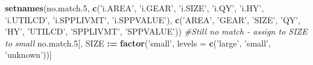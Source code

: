 \documentclass[]{article}
\newenvironment{Shaded}{\begin{snugshade}}{\end{snugshade}}
\newcommand{\KeywordTok}[1]{\textcolor[rgb]{0.13,0.29,0.53}{\textbf{#1}}}
\newcommand{\DataTypeTok}[1]{\textcolor[rgb]{0.13,0.29,0.53}{#1}}
\newcommand{\DecValTok}[1]{\textcolor[rgb]{0.00,0.00,0.81}{#1}}
\newcommand{\StringTok}[1]{\textcolor[rgb]{0.31,0.60,0.02}{#1}}
\newcommand{\CommentTok}[1]{\textcolor[rgb]{0.56,0.35,0.01}{\textit{#1}}}
\newcommand{\OperatorTok}[1]{\textcolor[rgb]{0.81,0.36,0.00}{\textbf{#1}}}
\newcommand{\ErrorTok}[1]{\textcolor[rgb]{0.64,0.00,0.00}{\textbf{#1}}}
\newcommand{\NormalTok}[1]{#1}
\begin{document}
\begin{Shaded}
\begin{Highlighting}[]
  \KeywordTok{setnames}\NormalTok{(no.match.}\DecValTok{5}\NormalTok{, }\KeywordTok{c}\NormalTok{(}\StringTok{'i.AREA'}\NormalTok{, }\StringTok{'i.GEAR'}\NormalTok{, }\StringTok{'i.SIZE'}\NormalTok{, }\StringTok{'i.QY'}\NormalTok{, }\StringTok{'i.HY'}\NormalTok{, }\StringTok{'i.UTILCD'}\NormalTok{, }\StringTok{'i.SPPLIVMT'}\NormalTok{, }\StringTok{'i.SPPVALUE'}\NormalTok{), }
                       \KeywordTok{c}\NormalTok{(}\StringTok{'AREA'}\NormalTok{,   }\StringTok{'GEAR'}\NormalTok{,   }\StringTok{'SIZE'}\NormalTok{,   }\StringTok{'QY'}\NormalTok{,   }\StringTok{'HY'}\NormalTok{,  }\StringTok{'UTILCD'}\NormalTok{,  }\StringTok{'SPPLIVMT'}\NormalTok{, }\StringTok{'SPPVALUE'}\NormalTok{))}
  \CommentTok{#Still no match - assign to SIZE to small}
\NormalTok{  no.match.}\DecValTok{5}\NormalTok{[, SIZE }\OperatorTok{:}\ErrorTok{=}\StringTok{ }\KeywordTok{factor}\NormalTok{(}\StringTok{'small'}\NormalTok{, }\DataTypeTok{levels =} \KeywordTok{c}\NormalTok{(}\StringTok{'large'}\NormalTok{, }\StringTok{'small'}\NormalTok{, }\StringTok{'unknown'}\NormalTok{))]}
  

\end{Highlighting}
\end{Shaded}
\end{document}
